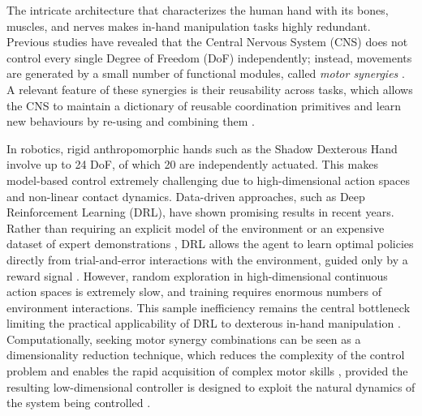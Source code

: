 \documentclass[letterpaper, 10 pt, conference]{ieeeconf}  %
\begin{document}
The intricate architecture that characterizes the human hand with its bones, muscles, and nerves makes in-hand manipulation tasks highly redundant. Previous studies have revealed that the Central Nervous System (CNS) does not control every single Degree of Freedom (DoF) independently; instead, movements are generated by a small number of functional modules, called \textit{motor synergies} \cite{c2}. A relevant feature of these synergies is their reusability across tasks, which allows the CNS to maintain a dictionary of reusable coordination primitives and learn new behaviours by re-using and combining them \cite{c3,c4}. 

In robotics, rigid anthropomorphic hands such as the Shadow Dexterous Hand involve up to 
24 DoF, of which 20 are independently actuated. This makes 
model-based control extremely challenging due to 
high-dimensional action spaces and non-linear contact dynamics. Data-driven approaches, such as Deep Reinforcement Learning (DRL), have shown promising results in recent years. Rather 
than requiring an explicit model of the environment or an expensive dataset of 
expert demonstrations \cite{c23}, DRL allows the agent to learn optimal policies directly 
from trial-and-error interactions with the environment, guided only by a reward 
signal \cite{c6}. However, random exploration in high-dimensional continuous 
action spaces is extremely slow, and training requires enormous numbers of 
environment interactions. This sample inefficiency remains the central bottleneck 
limiting the practical applicability of DRL to dexterous in-hand manipulation \cite{c7}. Computationally, seeking motor synergy combinations can be seen as a 
dimensionality reduction technique, which reduces the complexity 
of the control problem and enables the rapid acquisition of complex motor 
skills \cite{c5}, provided the resulting low-dimensional controller is 
designed to exploit the natural dynamics of the system being 
controlled \cite{c22}.
\end{document}
